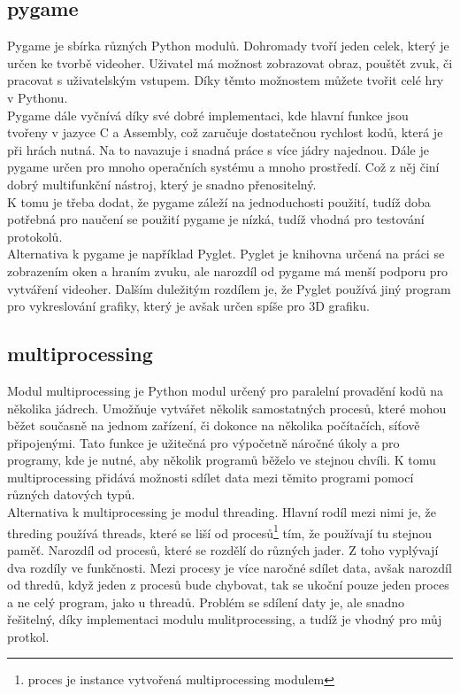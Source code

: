 \documentclass[12pt]{report}			%
\begin{document}
\subsection{pygame}
Pygame je sbírka různých Python modulů. Dohromady tvoří jeden celek, který je určen ke tvorbě videoher. Uživatel má možnost zobrazovat obraz, pouštět zvuk, či pracovat s uživatelským vstupem. Díky těmto možnostem můžete tvořit celé hry v Pythonu. 
\\
Pygame dále vyčnívá díky své dobré implementaci, kde hlavní funkce jsou tvořeny v jazyce C a Assembly, což zaručuje dostatečnou rychlost kodů, která je při hrách nutná. Na to navazuje i snadná práce s více jádry najednou. Dále je pygame určen pro mnoho operačních systému a mnoho prostředí. Což z něj činí dobrý multifunkční nástroj, který je snadno přenositelný. 
\\
K tomu je třeba dodat, že pygame záleží na jednoduchosti použití, tudíž doba potřebná pro naučení se použití pygame je nízká, tudíž vhodná pro testování protokolů. 
\\
Alternativa k pygame je například Pyglet. Pyglet je knihovna určená na práci se zobrazením oken a hraním zvuku, ale narozdíl od pygame má menší podporu pro vytváření videoher. Dalším duležitým rozdílem je, že Pyglet používá jiný program pro vykreslování grafiky, který je avšak určen spíše pro 3D grafiku. 

\subsection{multiprocessing}
Modul multiprocessing je Python modul určený pro paralelní provadění kodů na několika jádrech. Umožňuje vytvářet několik samostatných procesů, které mohou běžet současně na jednom zařízení, či dokonce na několika počítačích, síťově připojenými. Tato funkce je užitečná pro výpočetně náročné úkoly a pro programy, kde je nutné, aby několik programů běželo ve stejnou chvíli. K tomu multiprocessing přidává možnosti sdílet data mezi těmito programi pomocí různých datových typů. 
\\
Alternativa k multiprocessing je modul threading. Hlavní rodíl mezi nimi je, že threding používá threads, které se liší od procesů\footnote{proces je instance vytvořená multiprocessing modulem} tím, že používají tu stejnou paměť. Narozdíl od procesů, které se rozdělí do různých jader. Z toho vyplývají dva rozdíly ve funkčnosti. Mezi procesy je více naročné sdílet data, avšak narozdíl od thredů, když jeden z procesů bude chybovat, tak se ukoční pouze jeden proces a ne celý program, jako u threadů. Problém se sdílení daty je, ale snadno řešitelný, díky implementaci modulu mulitprocessing, a tudíž je vhodný pro můj protkol. 
\end{document}
